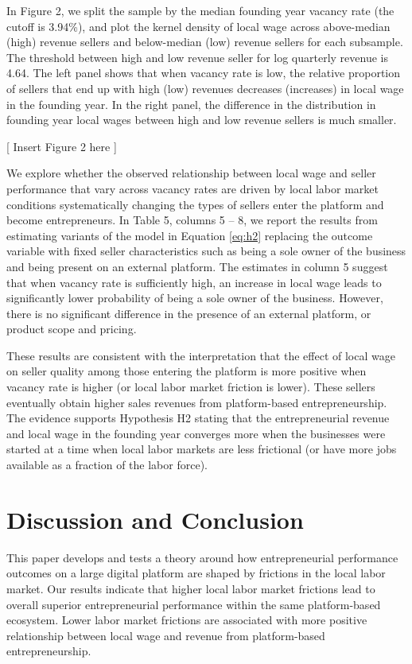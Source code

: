 \documentclass[letterpaper,12pt]{article}
\begin{document}
In Figure 2, we split the sample by the median founding year vacancy rate (the cutoff is 3.94\%), and plot the kernel density of local wage across above-median (high) revenue sellers and below-median (low) revenue sellers for each subsample. The threshold between high and low revenue seller for log quarterly revenue is 4.64. The left panel shows that when vacancy rate is low, the relative proportion of sellers that end up with high (low) revenues decreases (increases) in local wage in the founding year. In the right panel, the difference in the distribution in founding year local wages between high and low revenue sellers is much smaller. 

\begin{center}
[ Insert Figure 2 here ]
\end{center}

We explore whether the observed relationship between local wage and seller performance that vary across vacancy rates are driven by local labor market conditions systematically changing the types of sellers enter the platform and become entrepreneurs. In Table 5, columns 5 -- 8, we report the results from estimating variants of the model in Equation \ref{eq:h2} replacing the outcome variable with fixed seller characteristics such as being a sole owner of the business and being present on an external platform. The estimates in column 5 suggest that when vacancy rate is sufficiently high, an increase in local wage leads to significantly lower probability of being a sole owner of the business. However, there is no significant difference in the presence of an external platform, or product scope and pricing. 

These results are consistent with the interpretation that the effect of local wage on seller quality among those entering the platform is more positive when vacancy rate is higher (or local labor market friction is lower). These sellers eventually obtain higher sales revenues from platform-based entrepreneurship. The evidence supports Hypothesis H2 stating that the entrepreneurial revenue and local wage in the founding year converges more when the businesses were started at a time when local labor markets are less frictional (or have more jobs available as a fraction of the labor force).


\section{Discussion and Conclusion}
This paper develops and tests a theory around how entrepreneurial performance outcomes on a large digital platform are shaped by frictions in the local labor market. Our results indicate that higher local labor market frictions lead to overall superior entrepreneurial performance within the same platform-based ecosystem. Lower labor market frictions are associated with more positive relationship between local wage and revenue from platform-based entrepreneurship. 
\end{document}
